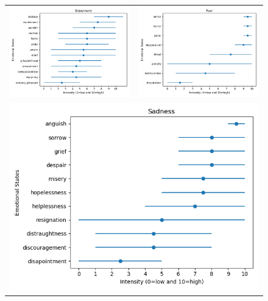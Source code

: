 \begin{figure}[!h]
\begin{tabular}{cc}
        \includegraphics[scale=0.5]{Images/AtlasEmotionalStatesGraphics/Figure_Enjoyment.png} & \includegraphics[scale=0.5]{Images/AtlasEmotionalStatesGraphics/Figure_Fear.png} \\
        \multicolumn{2}{c}{\includegraphics[scale=0.5]{Images/AtlasEmotionalStatesGraphics/Figure_Sadness.png}}
    \end{tabular}
    

\end{figure}
